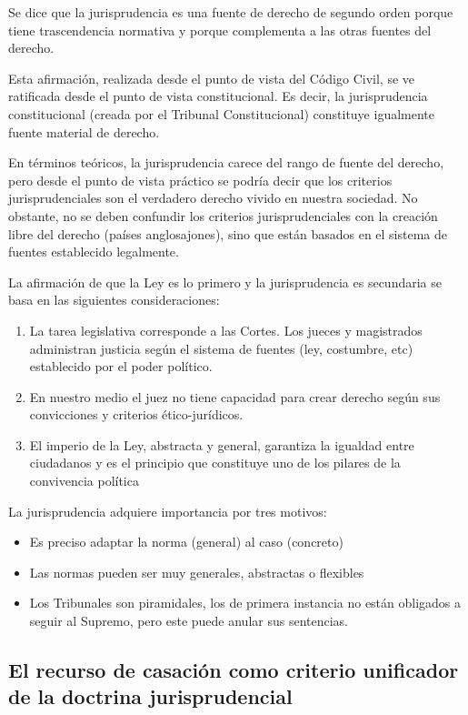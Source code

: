 \documentclass[a4paper,12pt]{report}
\begin{document}
Se dice que la jurisprudencia es una fuente de derecho de segundo orden porque tiene trascendencia normativa y porque complementa a las otras fuentes del derecho.

Esta afirmación, realizada desde el punto de vista del Código Civil, se ve ratificada desde el punto de vista constitucional. Es decir, la jurisprudencia constitucional (creada por el Tribunal Constitucional) constituye igualmente fuente material de derecho.

En términos teóricos, la jurisprudencia carece del rango de fuente del derecho, pero desde el punto de vista práctico se podría decir que los criterios jurisprudenciales son el verdadero derecho vivido en nuestra sociedad. No obstante, no se deben confundir los criterios jurisprudenciales con la creación libre del derecho (países anglosajones), sino que están basados en el sistema de fuentes establecido legalmente.

La afirmación de que la Ley es lo primero y la jurisprudencia es secundaria se basa en las siguientes consideraciones:
\begin{enumerate}
\item La tarea legislativa corresponde a las Cortes. Los jueces y magistrados administran justicia según el sistema de fuentes (ley, costumbre, etc) establecido por el poder político.
\item En nuestro medio el juez no tiene capacidad para crear derecho según sus convicciones y criterios ético-jurídicos.
\item El imperio de la Ley, abstracta y general, garantiza la igualdad entre ciudadanos y es el principio que constituye uno de los pilares de la convivencia política
\end{enumerate}

La jurisprudencia adquiere importancia por tres motivos:
\begin{itemize}
\item Es preciso adaptar la norma (general) al caso (concreto)
\item Las normas pueden ser muy generales, abstractas o flexibles
\item Los Tribunales son piramidales, los de primera instancia no están obligados a seguir al Supremo, pero este puede anular sus sentencias.
\end{itemize}

\subsection{El recurso de casación como criterio unificador de la doctrina jurisprudencial
}
\end{document}
